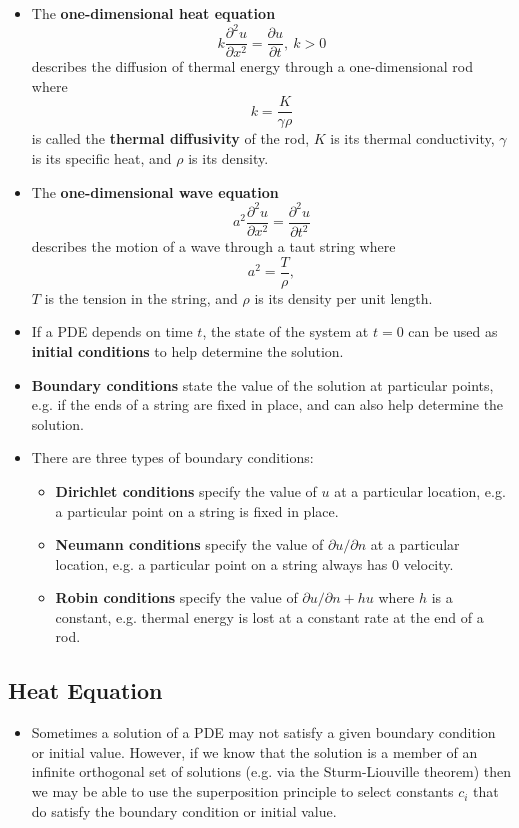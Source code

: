 \documentclass{article}
\begin{document}
\begin{itemize}
  \item The \textbf{one-dimensional heat equation} \[k \frac{\partial^2 u}{\partial x^2} = \frac{\partial u}{\partial t},\ k > 0\] describes the diffusion of thermal energy through a one-dimensional rod where \[k = \frac{K}{\gamma \rho}\] is called the \textbf{thermal diffusivity} of the rod, $K$ is its thermal conductivity, $\gamma$ is its specific heat, and $\rho$ is its density.

  \item The \textbf{one-dimensional wave equation} \[a^2 \frac{\partial^2 u}{\partial x^2} = \frac{\partial^2 u}{\partial t^2}\] describes the motion of a wave through a taut string where \[a^2 = \frac{T}{\rho},\] $T$ is the tension in the string, and $\rho$ is its density per unit length.

  \item If a PDE depends on time $t$, the state of the system at $t = 0$ can be used as \textbf{initial conditions} to help determine the solution.

  \item \textbf{Boundary conditions} state the value of the solution at particular points, e.g. if the ends of a string are fixed in place, and can also help determine the solution.

  \item There are three types of boundary conditions:

        \begin{itemize}
          \item \textbf{Dirichlet conditions} specify the value of $u$ at a particular location, e.g. a particular point on a string is fixed in place.

          \item \textbf{Neumann conditions} specify the value of $\partial u / \partial n$ at a particular location, e.g. a particular point on a string always has $0$ velocity.

          \item \textbf{Robin conditions} specify the value of $\partial u / \partial n + h u$ where $h$ is a constant, e.g. thermal energy is lost at a constant rate at the end of a rod.
        \end{itemize}
\end{itemize}

\subsection{Heat Equation}

\begin{itemize}
  \item Sometimes a solution of a PDE may not satisfy a given boundary condition or initial value. However, if we know that the solution is a member of an infinite orthogonal set of solutions (e.g. via the Sturm-Liouville theorem) then we may be able to use the superposition principle to select constants $c_i$ that do satisfy the boundary condition or initial value.
\end{itemize}
\end{document}
